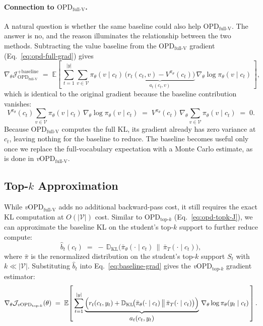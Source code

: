 \documentclass{article}
\newcommand{\method}{\emph{v}OPD}
\begin{document}
\paragraph{Connection to $\text{OPD}_\text{full-V}$.}
A natural question is whether the same baseline could also help $\text{OPD}_\text{full-V}$. The answer is no, and the reason illuminates the relationship between the two methods. Subtracting the value baseline from the $\text{OPD}_\text{full-V}$ gradient (Eq.~\eqref{eq:opd-full-grad}) gives
\begin{equation}
\label{eq:full-v-with-baseline}
\nabla_\theta \mathcal{J}_{\text{OPD}_\text{full-V}}^{\text{+baseline}}
\;=\;
\mathbb{E}\!\left[\, \sum_{t=1}^{|y|} \sum_{v \in \mathcal{V}}
\pi_\theta(v\mid c_t)\,
\underbrace{\bigl(r_t(c_t,v) - V^{\pi_\theta}(c_t)\bigr)}_{\textstyle a_t(c_t,v)}
\,\nabla_\theta\log \pi_\theta(v\mid c_t) \,\right],
\end{equation}
which is identical to the original gradient because the baseline contribution vanishes:
\begin{equation}
\label{eq:baseline-cancels}
V^{\pi_\theta}(c_t) \sum_{v \in \mathcal{V}} \pi_\theta(v\mid c_t)\,\nabla_\theta\log \pi_\theta(v\mid c_t)
\;=\; V^{\pi_\theta}(c_t)\,\nabla_\theta \!\sum_{v \in \mathcal{V}} \pi_\theta(v\mid c_t) \;=\; 0.
\end{equation}
Because $\text{OPD}_\text{full-V}$ computes the full KL, its gradient already has zero variance at $c_t$, leaving nothing for the baseline to reduce. The baseline becomes useful only once we replace the full-vocabulary expectation with a Monte Carlo estimate, as is done in \method$_\text{full-V}$.

\subsection{Top-$k$ Approximation}
\label{sec:vopd-topk}
While \method$_\text{full-V}$ adds no additional backward-pass cost, it still requires the exact KL computation at $O(|\mathcal{V}|)$ cost. Similar to $\text{OPD}_\text{top-$k$}$ (Eq.~\eqref{eq:opd-topk-J}), we can approximate the baseline KL on the student's top-$k$ support to further reduce compute:
\begin{equation}
\label{eq:vopd-topk-baseline}
\hat b_t(c_t)
\;=\;
-\,\mathbb{D}_\mathrm{KL}\!\bigl(\bar\pi_\theta(\cdot\mid c_t) \,\big\|\, \bar\pi_T(\cdot\mid c_t)\bigr),
\end{equation}
where $\bar\pi$ is the renormalized distribution on the student's top-$k$ support $S_t$ with $k \ll |\mathcal{V}|$. Substituting $\hat b_t$ into Eq.~\eqref{eq:baseline-grad} gives the \method$_\text{top-$k$}$ gradient estimator:
\begin{equation}
\label{eq:vopd-topk-grad}
\nabla_\theta \mathcal{J}_{\text{\method}_\text{top-$k$}}(\theta)
\;=\;
\mathbb{E}\!\left[\, \sum_{t=1}^{|y|}
\underbrace{\Bigl( r_t(c_t,y_t) + \mathbb{D}_\mathrm{KL}\!\bigl(\bar\pi_\theta(\cdot\mid c_t) \,\big\|\, \bar\pi_T(\cdot\mid c_t)\bigr) \Bigr)}_{\textstyle a_t(c_t,y_t)}
\,\nabla_\theta \log \pi_\theta(y_t\mid c_t) \,\right].
\end{equation}
\end{document}
